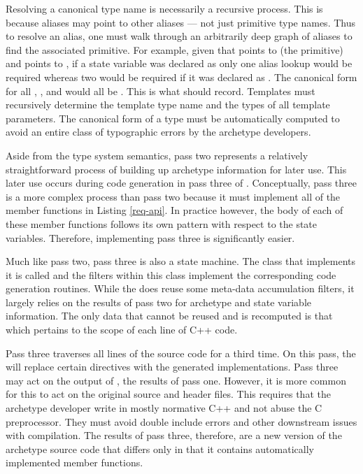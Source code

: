 Resolving a canonical type name is necessarily a recursive process.
This is because aliases may point to other aliases --- not just primitive type names.
Thus to resolve an alias, one must walk through an arbitrarily deep graph of aliases 
to find the associated primitive.  For example, given that  points 
to  (the primitive) and  points to , 
if a state variable was declared as  only one alias lookup would
be required whereas two would be required
if it was declared as . The canonical
form for all , , and  would all be 
.  This is what \cycpp should record.  Templates must recursively 
determine the template type name and the types of all template parameters.
The canonical form of a type must be automatically computed to avoid an
entire class of typographic errors by the archetype developers.

Aside from the type system semantics, pass two represents a relatively straightforward
process of building up archetype information for later use. This
later use occurs during code generation in pass three of \cycpp. Conceptually, 
pass three is a more complex process than pass two because it must implement 
all of the member functions in Listing \ref{req-api}. In practice however, the body 
of each of these member functions follows its own pattern with respect to the 
state variables. Therefore, implementing pass three is significantly easier.

Much like pass two, pass three is also a state machine. The class that implements it is 
called  and the filters within this class implement 
the corresponding code generation routines.  While the   does 
reuse some meta-data accumulation filters, it largely relies on the results of 
pass two for archetype and state variable information.  The only data that cannot be 
reused and is recomputed is that which pertains to the scope of each line of C++ code.

Pass three traverses all lines of the source code for a third time.
On this pass, the  will replace certain 
directives with the generated implementations.  Pass three may act on the output of
, the results of pass one.  However, it is more common for this 
to act on the original source and header files.  This requires that the 
archetype developer write in mostly normative C++ and not abuse the C
preprocessor. They must 
avoid double include errors and other downstream issues with 
compilation. The results of pass three, therefore, are a new version of the 
archetype
source code that differs only in that it contains automatically implemented 
member functions.

